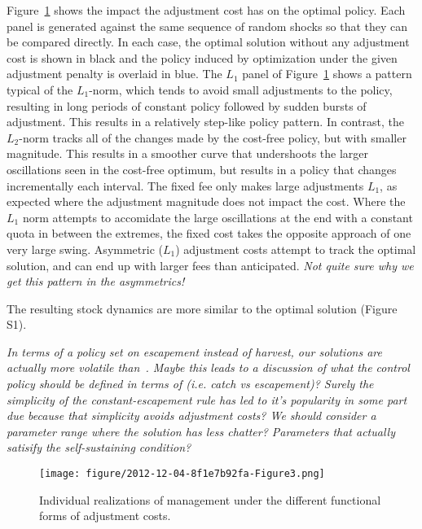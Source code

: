 \documentclass[authoryear, review, 12pt]{elsarticle}
\newcommand{\cdb}[1]{{\it \color{darkgreen} #1}}
\begin{document}
Figure~\ref{fig:shapes} shows the impact the adjustment cost has on the optimal policy.   Each panel is generated against the same sequence of random shocks so that they can be compared directly.  In each case, the optimal solution without any adjustment cost is shown in black and the policy induced by optimization under the given adjustment penalty is overlaid in blue.  The $L_1$ panel of Figure~\ref{fig:shapes} shows a pattern typical of the $L_1$-norm, which tends to avoid small adjustments to the policy, resulting in long periods of constant policy followed by sudden bursts of adjustment. This results in a relatively step-like policy pattern.  In contrast, the $L_2$-norm tracks all of the changes made by the cost-free policy, but with smaller magnitude.  This results in a smoother curve that undershoots the larger oscillations seen in the cost-free optimum, but results in a policy that changes incrementally each interval.  The fixed fee only makes large adjustments $L_1$, as expected where the adjustment magnitude does not impact the cost.  Where the $L_1$ norm attempts to accomidate the large oscillations at the end with a constant quota in between the extremes, the fixed cost takes the opposite approach of one very large swing.  Asymmetric ($L_1$) adjustment costs attempt to track the optimal solution, and can end up with larger fees than anticipated.  \cdb{Not quite sure why we get this pattern in the asymmetrics!}

The resulting stock dynamics are more similar to the optimal solution (Figure S1).   

\cdb{ In terms of a policy set on escapement instead of harvest, our solutions are actually more volatile than~\citet{Reed1979}.  Maybe this leads to a discussion of what the control policy should be defined in terms of (i.e. catch vs escapement)?  Surely the simplicity of the constant-escapement rule has led to it's popularity in some part due because that simplicity avoids adjustment costs?  We should consider a parameter range where the solution has less chatter?  Parameters that actually satisify the \citet{Reed1979} self-sustaining condition?}

\begin{figure}
    \begin{center}
      \texttt{[image: figure/2012-12-04-8f1e7b92fa-Figure3.png]}
  \end{center}
  \caption{Individual realizations of management under the different functional forms of adjustment costs.} \label{fig:shapes}
\end{figure}
\end{document}
